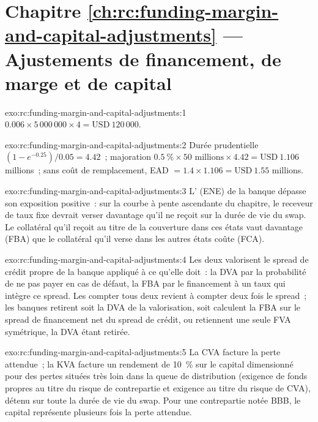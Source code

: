 \section*{Chapitre \ref{ch:rc:funding-margin-and-capital-adjustments} --- Ajustements de financement, de marge et de capital}

\begin{solution}{exo:rc:funding-margin-and-capital-adjustments:1}
$0.006\times5\,000\,000\times4 = \text{USD}~120\,000$.
\end{solution}

\begin{solution}{exo:rc:funding-margin-and-capital-adjustments:2}
Durée prudentielle $(1-e^{-0.25})/0.05 = 4.42$~; majoration $0.5~\%\times50\text{ millions}\times4.42 =
\text{USD}~1.106$ millions~; sans coût de remplacement, EAD $= 1.4\times1.106 = \text{USD}~1.55$ millions.
\end{solution}

\begin{solution}{exo:rc:funding-margin-and-capital-adjustments:3}
L' (ENE) de la banque dépasse son exposition positive~: sur la courbe à pente ascendante du chapitre,
le receveur de taux fixe devrait verser davantage qu'il ne reçoit sur la durée de vie du swap. Le
collatéral qu'il reçoit au titre de la couverture dans ces états vaut davantage (FBA) que le
collatéral qu'il verse dans les autres états coûte (FCA).
\end{solution}

\begin{solution}{exo:rc:funding-margin-and-capital-adjustments:4}
Les deux valorisent le spread de crédit propre de la banque appliqué à ce qu'elle doit~: la DVA par la probabilité de ne pas payer en cas de défaut,
la FBA par le financement à un taux qui intègre ce spread. Les compter tous deux revient à compter deux fois le spread~;
les banques retirent soit la DVA de la valorisation, soit calculent la FBA sur le spread de financement
net du spread de crédit, ou retiennent une seule FVA symétrique, la DVA étant retirée.
\end{solution}

\begin{solution}{exo:rc:funding-margin-and-capital-adjustments:5}
La CVA facture la perte attendue~; la KVA facture un rendement de 10~\% sur le capital dimensionné pour des pertes situées très loin
dans la queue de distribution (exigence de fonds propres au titre du risque de contrepartie et exigence au titre du risque de CVA), détenu sur toute la durée de vie du swap. Pour une contrepartie notée BBB,
le capital représente plusieurs fois la perte attendue.
\end{solution}

